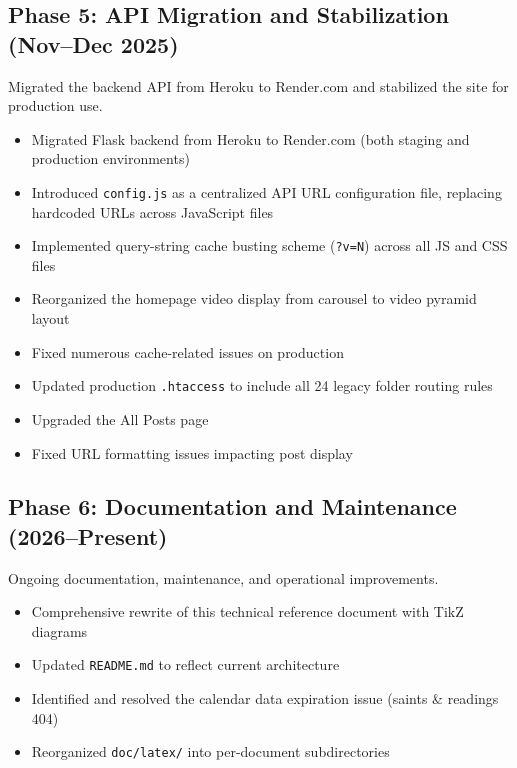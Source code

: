 \documentclass[12pt]{article}
\begin{document}
\subsection{Phase 5: API Migration and Stabilization (Nov--Dec 2025)}

Migrated the backend API from Heroku to Render.com and stabilized the site for production use.

\begin{itemize}
    \item Migrated Flask backend from Heroku to Render.com (both staging and production environments)
    \item Introduced \texttt{config.js} as a centralized API URL configuration file, replacing hardcoded URLs across JavaScript files
    \item Implemented query-string cache busting scheme (\texttt{?v=N}) across all JS and CSS files
    \item Reorganized the homepage video display from carousel to video pyramid layout
    \item Fixed numerous cache-related issues on production
    \item Updated production \texttt{.htaccess} to include all 24 legacy folder routing rules
    \item Upgraded the All Posts page
    \item Fixed URL formatting issues impacting post display
\end{itemize}

\subsection{Phase 6: Documentation and Maintenance (2026--Present)}

Ongoing documentation, maintenance, and operational improvements.

\begin{itemize}
    \item Comprehensive rewrite of this technical reference document with TikZ diagrams
    \item Updated \texttt{README.md} to reflect current architecture
    \item Identified and resolved the calendar data expiration issue (saints \& readings 404)
    \item Reorganized \texttt{doc/latex/} into per-document subdirectories
\end{itemize}

\end{document}
